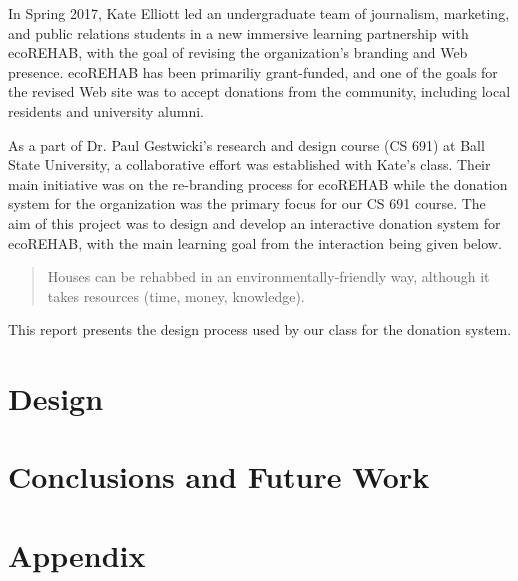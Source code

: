 \documentclass[letter]{article}
\begin{document}
In Spring 2017, Kate Elliott led an undergraduate team of journalism,
marketing, and public relations students in a new immersive learning
partnership with ecoREHAB, with the goal of revising the organization's
branding and Web presence.
ecoREHAB has been primariliy grant-funded, and one of the 
goals for the revised Web site was to accept donations from
the community, including local residents and university alumni.

As a part of Dr. Paul Gestwicki's research and design course (CS 691) at Ball State University, a collaborative effort was established with Kate's class. Their main initiative was on the re-branding process for ecoREHAB while the donation system for the organization was the primary focus for our CS 691 course. The aim of this project was to design and develop an interactive donation system for ecoREHAB, with the main learning goal from the interaction being given below.

\begin{quote}
	Houses can be rehabbed in an environmentally-friendly way, although it takes resources (time, money, knowledge).
\end{quote}

This report presents the design process used by our class for the donation system.

\section*{Design}

\section*{Conclusions and Future Work}

\section*{Appendix}
\end{document}
